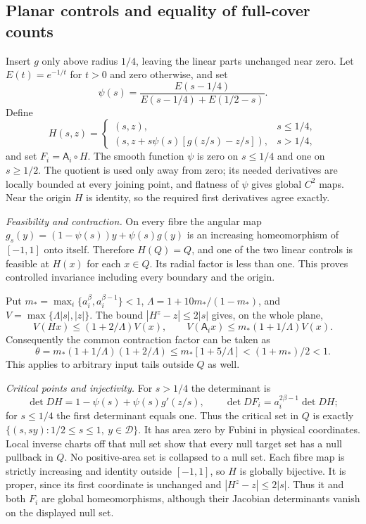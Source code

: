 \documentclass[11pt]{amsart}
\theoremstyle{definition}
\theoremstyle{remark}
\numberwithin{equation}{section}
\begin{document}
\subsection{Planar controls and equality of full-cover counts}
Insert $g$ only above radius $1/4$, leaving the linear parts
unchanged near zero. Let $E(t)=e^{-1/t}$ for $t>0$ and zero
otherwise, and set
\[
\psi(s)=\frac{E(s-1/4)}{E(s-1/4)+E(1/2-s)}.
\]
Define
\[
H(s,z)=
\begin{cases}
(s,z),&s\le1/4,\\
(s,z+s\psi(s)[g(z/s)-z/s]),&s>1/4,
\end{cases}
\]
and set $F_i=\mathsf A_i\circ H$.
The smooth function $\psi$ is zero on $s\le1/4$ and one on
$s\ge1/2$. The quotient is used only away from zero; its needed
derivatives are locally bounded at every joining point, and flatness
of $\psi$ gives global $C^2$ maps. Near the origin $H$ is identity,
so the required first derivatives agree exactly.

\smallskip
\emph{Feasibility and contraction.}
On every fibre the angular map
$g_s(y)=(1-\psi(s))y+\psi(s)g(y)$ is an increasing homeomorphism
of $[-1,1]$ onto itself. Therefore $H(Q)=Q$, and one of the
two linear controls is feasible at $H(x)$ for each $x\in Q$.
Its radial factor is less than one. This proves controlled invariance
including every boundary and the origin.

Put $m_* =\max_i\{a_i^\beta,a_i^{\beta-1}\}<1$,
$\Lambda=1+10m_* /(1-m_*)$, and $V=\max\{\Lambda|s|,|z|\}$.
The bound $|H^z-z|\le2|s|$ gives, on the whole plane,
\[
V(Hx)\le(1+2/\Lambda)V(x),\qquad
V(\mathsf A_i x)\le m_*(1+1/\Lambda)V(x).
\]
Consequently the common contraction factor can be taken as
\[
\theta=m_*(1+1/\Lambda)(1+2/\Lambda)
 \le m_*[1+5/\Lambda]<(1+m_*)/2<1.
\]
This applies to arbitrary input tails outside $Q$ as well.

\smallskip
\emph{Critical points and injectivity.}
For $s>1/4$ the determinant is
\[
\det DH=1-\psi(s)+\psi(s)g'(z/s),\qquad
\det DF_i=a_i^{2\beta-1}\det DH;
\]
for $s\le1/4$ the first determinant equals one.
Thus the critical set in $Q$ is exactly
$\{(s,sy):1/2\le s\le1,\ y\in\mathcal D\}$.
It has area zero by Fubini in physical coordinates. Local inverse
charts off that null set show that every null target set has a null
pullback in $Q$. No positive-area set is collapsed to a null set.
Each fibre map is strictly increasing and identity outside $[-1,1]$,
so $H$ is globally bijective. It is proper, since its first coordinate
is unchanged and $|H^z-z|\le2|s|$. Thus it and both $F_i$ are
global homeomorphisms, although their Jacobian determinants vanish
on the displayed null set.
\end{document}
